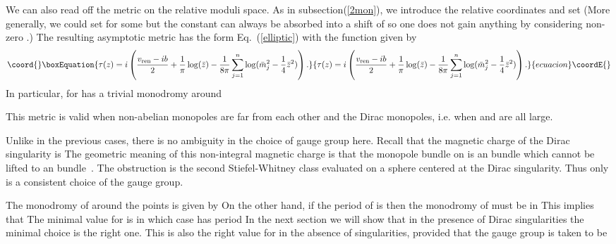 \documentclass[a4paper,12pt, amsfonts, amssymb]{article}
\providecommand{\CC}{{\mathbb C}}
\providecommand{\RR}{{\mathbb R}}
\providecommand{\ZZ}{{\mathbb Z}}
\providecommand{\NN}{{\mathbb N}}
\renewcommand{\SS}{{\mathbb S}}
\providecommand{\ra}{\rightarrow}
\providecommand{\vr}{v_{{\rm ren}}}
\begin{document}
We can also read off the metric on the relative moduli space.
As in subsection(\ref{2mon}), we introduce the relative coordinates
\coordHE{} and set \coordHE{} (More generally, we could set \coordHE{} for some \myHighlight{$c\in\CC,$}\coordHE{} but the constant
\coordHE{} can always be absorbed into a shift of \coordHE{} so one does not gain
anything by considering non-zero
\coordHE{}.) The resulting asymptotic metric has the form Eq.~(\ref{elliptic})
with the function \coordHE{} given by
\begin{equation}\coord{}\boxEquation{\label{tausing}
\tau(z)=i\left(\frac{\vr-ib}{2}+\frac{1}{\pi}\log(\bar{z})-
\frac{1}{8\pi}\sum_{j=1}^n\log(\bar{m}_j^2-\frac{1}{4}\bar{z}^2)\right).
}{\tau(z)=i\left(\frac{\vr-ib}{2}+\frac{1}{\pi}\log(\bar{z})-
\frac{1}{8\pi}\sum_{j=1}^n\log(\bar{m}_j^2-\frac{1}{4}\bar{z}^2)\right).
}{ecuacion}\coordE{}\end{equation}
In particular, for \coordHE{}  \coordHE{} has a trivial monodromy around
\coordHE{}

This metric is valid when non-abelian monopoles are far from each other
and the Dirac monopoles, i.e. when \coordHE{} and \coordHE{}  \coordHE{}
are all large.

Unlike in the previous cases, there is no ambiguity in the choice of
gauge group here. Recall that the magnetic
charge of the Dirac singularity is \coordHE{} The geometric meaning of
this non-integral magnetic charge is that the monopole bundle on
\myHighlight{$\RR^2\times\SS^1$}\coordHE{} is an \coordHE{} bundle which cannot be lifted
to an \coordHE{} bundle~\cite{ustwo}. The obstruction is the second
Stiefel-Whitney class evaluated on a sphere centered at the Dirac
singularity. Thus only \coordHE{} is a consistent choice of the gauge group.

The monodromy of \myHighlight{$\tau$}\coordHE{} around
the points \coordHE{} is given by \myHighlight{$\tau\ra\tau + 1/4.$}\coordHE{} On the other
hand, if the period of \coordHE{} is \coordHE{} then the monodromy of
\coordHE{} must be in \myHighlight{$PSL_2(\ZZ).$}\coordHE{} This implies that \myHighlight{$p/4\in\NN.$}\coordHE{}
The minimal value for \coordHE{} is \coordHE{} in which case \coordHE{} has
period \coordHE{}
In the next section we will show that in the presence of Dirac
singularities the minimal choice \coordHE{} is the right one.
This is also the right value for \coordHE{} in the absence of singularities,
provided that the gauge group is taken to be \coordHE{}
\end{document}
